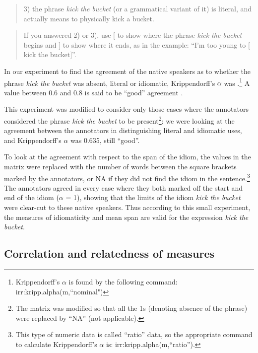 \documentclass[output=paper]{langsci/langscibook}
\begin{document}
\begin{quotation}
3) the phrase \textit{kick the bucket} (or a grammatical variant of it) is
literal, and actually means to physically kick a bucket.
\end{quotation}

\begin{quotation}
If you answered 2) or 3), use $[$ to show where the phrase \textit{kick the bucket} begins and $]$ to show where it ends, as in the example: ``I'm too
young to $[$kick the bucket$]$”.
\end{quotation}


In our experiment to find the agreement of the native speakers as to
whether the phrase \textit{kick the bucket} was absent, literal or idiomatic,
Krippendorff’s $\alpha$ was .\footnote{ Krippendorff’s $\alpha$ is found
by the following command: 
irr:kripp.alpha(m,``nominal")}  A value
between 0.6 and 0.8 is said to be “good” agreement \citep[404]{altmann1991}.



This experiment was modified to consider only those cases where the
annotators considered the phrase \textit{kick the bucket} to be
present\footnote{The matrix was modified so that all the 1s (denoting
absence of the phrase) were replaced by “NA” (not applicable).}: we were
looking at the agreement between the annotators in distinguishing
literal and idiomatic uses, and Krippendorff’s $\alpha$ was 0.635, still
“good”.



To look at the agreement with respect to the span of the idiom, the
values in the matrix were replaced with the number of words between the
square brackets marked by the annotators, or NA if they did not find
the idiom in the sentence.\footnote{ This type of numeric data is called
“ratio” data, so the appropriate command to calculate Krippendorff’s
$\alpha$ is: irr:kripp.alpha(m,``ratio”).} The annotators agreed in every
case where they both marked off the start and end of the idiom ($\alpha$ =
1), showing that the limits of the idiom \textit{kick the bucket} were
clear-cut to these native speakers. Thus according to this small
experiment, the measures of idiomaticity and mean span are valid for
the expression \textit{kick the bucket}. 



\subsection{Correlation and relatedness of measures}
\end{document}

